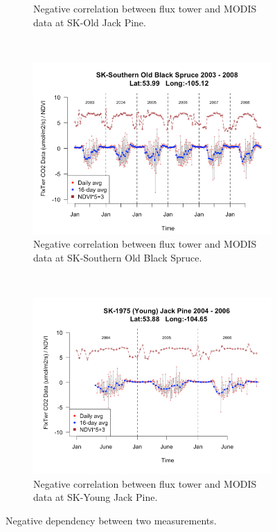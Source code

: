 \documentclass{article}\usepackage[]{graphicx}\usepackage[]{color}
\begin{document}
\begin{figure}[ht]
\begin{subfigure}[ht]{0.45\textwidth}
        \caption{Negative correlation between flux tower and MODIS data at SK-Old Jack Pine.}
        \label{Fig:NegCorr_OJP}
     \end{subfigure}
        ~ %
      \begin{subfigure}[ht]{0.45\textwidth}
        \includegraphics[width=\textwidth]{SOU_plot_together.png}
        \caption{Negative correlation between flux tower and MODIS data at SK-Southern Old Black Spruce.}
        \label{Fig:NegCorr_SOU}
     \end{subfigure}
     ~
      \begin{subfigure}[ht]{0.45\textwidth}
        \includegraphics[width=\textwidth]{YJP_plot_together.png}
        \caption{Negative correlation between flux tower and MODIS data at SK-Young Jack Pine.}
        \label{Fig:NegCorr_YJP}
     \end{subfigure}
    \caption{Negative dependency between two measurements.}\label{Fig:NegCorr}
\end{figure}
\end{document}
